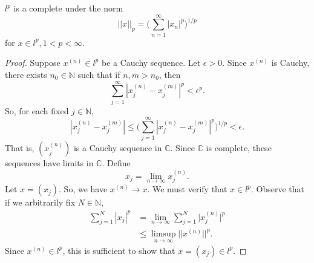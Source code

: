 \begin{theorem}
$l^p$ is a complete under the norm
\[||x||_p = \biggl(\sum_{n=1}^{\infty}|x_n|^p\biggr)^{1/p}\]
for $x \in l^p, 1 < p < \infty$.
\end{theorem}

\begin{proof}
Suppose $x^{(n)} \in l^p$ be a Cauchy sequence.  Let $\epsilon > 0$.  Since $x^{(n)}$ is Cauchy, there exists $n_0 \in \mathbb{N}$ such that if $n,m > n_0$, then
\[\sum_{j=1}^{\infty} |x_j^{(n)} - x_j^{(m)}|^p < \epsilon ^p.\]
So, for each fixed $j \in \mathbb{N}$,
\[|x_j^{(n)} - x_j^{(m)}| \leq \biggl(\sum_{j=1}^{\infty} |x_j^{(n)} - x_j^{(m)}|^p\biggr)^{1/p} < \epsilon .\]
That is, $(x_j^{(n)})$ is a Cauchy sequence in $\mathbb{C}$.  Since $\mathbb{C}$ is complete, these sequences have limits in $\mathbb{C}$.  Define
\[x_j = \lim_{n \to \infty} x_j^{(n)}.\]
Let $x = (x_j)$.  So, we have $x^{(n)} \to x$.  We must verify that $x \in l^p$.  Observe that if we arbitrarily fix $N \in \mathbb{N}$,
\begin{align*}
\sum_{j=1}^{N} |x_j|^p &= \lim_{n \to \infty} \sum_{j=1}^{N} \bigl|x_j^{(n)}\bigr|^p\\
&\leq \limsup_{n \to \infty} ||x^{(n)}||^p.
\end{align*}
Since $x^{(n)} \in l^p$, this is sufficient to show that $x = (x_j) \in l^p$.
\end{proof}